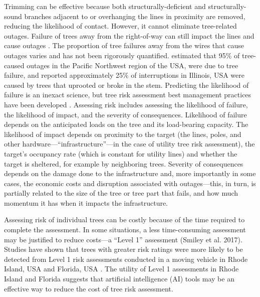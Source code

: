 \documentclass[11pt,twoside]{article}
\numberwithin{equation}{section}
\newcommand{\?}{\stackrel{?}{=}}
\begin{document}
Trimming can be effective because both structurally-deficient and structurally-sound branches adjacent to or overhanging
the lines in proximity are removed, reducing the likelihood of contact.
However, it cannot eliminate tree-related outages. Failure of trees away from the right-of-way can still impact the
lines and cause outages \cite{guggenmoos2003effects}. The proportion of tree failures away from the wires that cause
outages varies and has not been rigorously quantified. \citet{guggenmoos2011treerelated} estimated that 95\% of
tree-caused outages in the Pacific Northwest region of the USA, were due to tree failure, and \citet{wismer2018targeted}
reported approximately 25\% of interruptions in Illinois, USA were caused by trees that uprooted or broke in the stem.
Predicting the likelihood of failure is an inexact science, but tree risk assessment best management practices have been
developed \cite{e.thomassmiley2017best,johnw.goodfellow2020best}. Assessing risk includes assessing the likelihood of
failure, the likelihood of impact, and the severity of consequences. Likelihood of failure depends on the anticipated
loads on the tree and its load-bearing capacity. The likelihood of impact depends on proximity to the target (the lines,
poles, and other hardware—“infrastructure”—in the case of utility tree risk assessment), the target’s occupancy rate
(which is constant for utility lines) and whether the target is sheltered, for example by neighboring trees. Severity of
consequences depends on the damage done to the infrastructure and, more importantly in some cases, the economic costs
and disruption associated with outages—this, in turn, is partially related to the size of the tree or tree part that
fails, and how much momentum it has when it impacts the infrastructure.

Assessing risk of individual trees can be costly because of the time required to complete the assessment. In some
situations, a less time-consuming assessment may be justified to reduce costs—a ``Level 1'' assessment (Smiley et
al. 2017). Studies have shown that trees with greater risk ratings were more likely to be detected from Level 1 risk
assessments conducted in a moving vehicle in Rhode Island, USA \cite{rooney2005reliability} and Florida, USA
\cite{koeser2016frequency} . The utility of Level 1 assessments in Rhode Island and Florida suggests that artificial
intelligence (AI) tools may be an effective way to reduce the cost of tree risk assessment.
\end{document}
